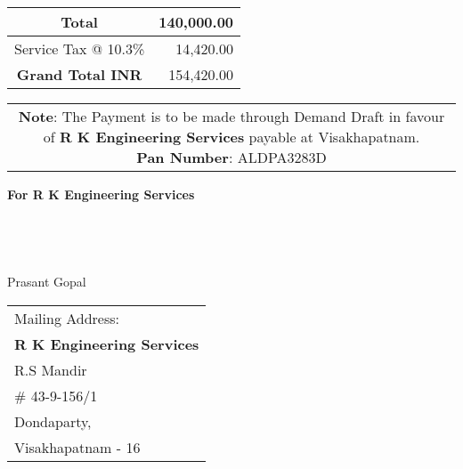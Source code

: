 \documentclass[11pt]{article}
\begin{document}

\hspace*{12.38cm}
\begin{tabular}{|c|r|}
\hline
Total & 140,000.00 \\
\hline
Service Tax @ 10.3\% & 14,420.00 \\
\hline
{\bf Grand Total INR} & 154,420.00 \\
\hline
\end{tabular}

\vspace*{-1 cm}
\noindent \begin{tabular}{c}
\parbox{4in}{ {\bf Note}: The Payment is to be made through Demand Draft in favour of {\bf R K Engineering Services} payable at Visakhapatnam. \\
{\noindent \bf Pan Number}:  ALDPA3283D }\\
\end{tabular}
\vspace*{105pt}


{\bf For  R K Engineering Services } \\ \\ \\ \\ \\
 \hspace*{0.6cm}Prasant Gopal
\vspace*{-70pt}
\begin{flushright}
\begin{tabular}{l}
Mailing Address:\\
{\bf R K Engineering Services}\\
R.S Mandir\\
\# 43-9-156/1\\
Dondaparty, \\ 
Visakhapatnam - 16\\
\end{tabular}
\end{flushright}
\end{document}

